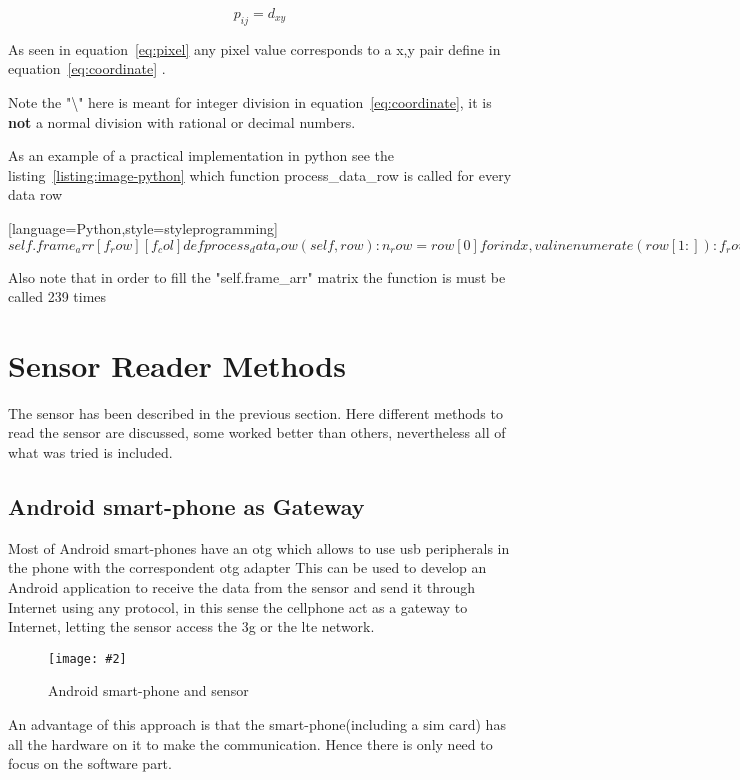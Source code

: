 \documentclass[hidelinks,11pt,a4paper,oneside,article]{memoir}
\newcommand{\putimage}[3][10] %
{
\begin{figure}[h]
	\centering
	\captionsetup{justification=centering}
	\texttt{[image: \#2]}
	\caption{#3}
	\label{fig:#2}
\end{figure}
}
\begin{document}
\begin{equation}
\label{eq:pixel}
p_{ij} = d_{xy}
\end{equation}

As seen in equation~\ref{eq:pixel} any pixel value corresponds to a x,y pair define in equation~\ref{eq:coordinate} .

Note the "\textbackslash" here is meant for integer division in equation~\ref{eq:coordinate}, it is \textbf{not} a normal division with rational or decimal numbers.

As an example of a practical implementation in \gls{python} see the listing~\ref{listing:image-python} which function process{\_}data{\_}row is called for every data row

[language=Python,style=styleprogramming]$
self.frame_arr[f_row][f_col]

def process_data_row(self, row):
    n_row = row[0]
    
    for indx, val in enumerate(row[1:]):
        f_row = (n_row)/2
        f_col = (n_row) %
        self.frame_arr[f_row][f_col] = val
$ 

Also note that in order to fill the "self.frame{\_}arr" matrix the function is must be called 239 times

\section{Sensor Reader Methods}
The sensor has been described in the previous section. Here different methods to read the sensor are discussed, some worked better than others, nevertheless all of what was tried is included.

\subsection{Android smart-phone as Gateway}
Most of Android smart-phones have an \gls{otg} which allows to use \gls{usb} peripherals in the phone with the correspondent \gls{otg} adapter This can be used to develop an Android application to receive the data from the sensor and send it through Internet using any protocol, in this sense the cellphone act as a gateway to Internet, letting the sensor access the \gls{3g} or the \gls{lte} network.

\putimage{android_otg}{Android smart-phone and sensor}

An advantage of this approach is that the smart-phone(including a \gls{sim} card) has all the hardware on it to make the communication. Hence there is only need to focus on the software part.
\end{document}
